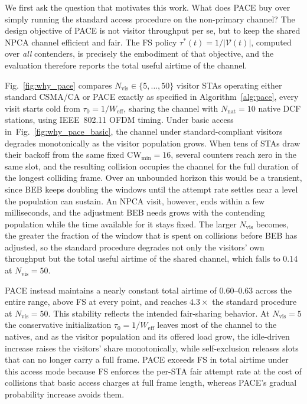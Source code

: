 \documentclass[conference]{IEEEtran}
\newcommand{\Nvis}{N_\mathrm{vis}}
\newcommand{\Nnat}{N_\mathrm{nat}}
\begin{document}
We first ask the question that motivates this work. What does PACE buy over simply running the standard access procedure on the non-primary channel? The design objective of PACE is not visitor throughput per se, but to keep the shared NPCA channel efficient and fair. The FS policy $\tau^*(t)=1/|\mathcal{V}(t)|$, computed over \emph{all} contenders, is
precisely the embodiment of that objective, and the evaluation therefore reports the total useful airtime of the channel.

Fig.~\ref{fig:why_pace} compares $\Nvis\in\{5,\dots,50\}$ visitor STAs operating either standard CSMA/CA or PACE exactly as specified in Algorithm~\ref{alg:pace}, every visit starts cold from $\tau_0=1/W_\mathrm{eff}$, sharing the channel with $\Nnat=10$ native DCF stations, using IEEE~802.11 OFDM timing. Under basic access in~Fig.~\ref{fig:why_pace_basic}, the channel under standard-compliant visitors degrades monotonically as the visitor population grows. When tens of STAs draw their backoff from the same fixed $\mathrm{CW}_{\min}=16$, several counters reach zero in the same slot, and the resulting collision occupies the channel for the full duration of the longest colliding frame. Over an unbounded horizon this would be a transient, since BEB keeps doubling the windows until the attempt rate settles near a level the population can sustain. An NPCA visit, however, ends within a few milliseconds, and the adjustment BEB needs grows with the contending population while the time available for it stays fixed. The larger $\Nvis$ becomes, the greater the fraction of the window that is spent on collisions before BEB has adjusted, so the standard procedure degrades not only the visitors' own throughput but the total useful airtime of the shared channel, which falls to $0.14$ at $\Nvis=50$.

PACE instead maintains a nearly constant total airtime of $0.60$--$0.63$ across the entire range, above FS at every point, and reaches $4.3\times$ the standard procedure at $\Nvis=50$. This stability reflects the intended fair-sharing behavior. At $\Nvis=5$ the conservative initialization $\tau_0=1/W_\mathrm{eff}$ leaves most of the channel to the natives, and as the visitor population and its offered load grow, the idle-driven increase raises the visitors' share monotonically, while self-exclusion releases slots that can no longer carry a full frame. PACE exceeds FS in total airtime under this access mode because FS enforces the per-STA fair attempt rate at the cost of collisions that basic access charges at full frame length, whereas PACE's gradual probability increase avoids them.
\end{document}
